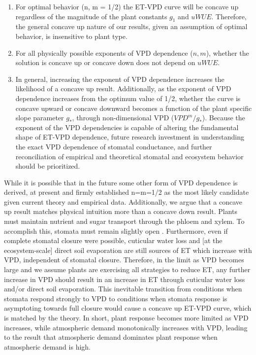 \documentclass[draft,linenumbers]{agujournal}
\begin{document}
\begin{enumerate}
  \item For optimal behavior (n, m = 1/2) the ET-VPD curve will be
    concave up regardless of the magnitude of the plant constants
    $g_1$ and $uWUE$. Therefore, the general concave up nature of our
    results, given an assumption of optimal behavior, is insensitive
    to plant type.
  \item For all physically possible exponents of VPD dependence ($n,
    m$), whether the solution is concave up or concave down does not
    depend on $uWUE$.
  \item In general, increasing the exponent of VPD dependence
    increases the likelihood of a concave up result. Additionally, as
    the exponent of VPD dependence increases from the optimum value of
    1/2, whether the curve is concave upward or concave downward
    becomes a function of the plant specific slope parameter $g_*$,
    through non-dimensional VPD ($VPD^m/g_*$). Because the exponent of
    the VPD dependencies is capable of altering the fundamental shape
    of ET-VPD dependence, future research investment in understanding
    the exact VPD dependence of stomatal conductance, and further
    reconciliation of empirical and theoretical stomatal and
    ecosystem behavior should be prioritized.
\end{enumerate}
While it is possible that in the future some other form of
VPD dependence is derived, at present \cite{MEDLYN_2011} and
\cite{Zhou_2014} firmly established n=m=1/2 as the most likely
candidate given current theory and empirical data. Additionally, we
argue that a concave up result matches physical intuition more than a
concave down result. Plants must maintain nutrient and sugar transport
through the phloem and xylem. To accomplish this, stomata must remain
slightly open \citep{De_2013, Nikinmaa_2013, Ryan_2014}. Furthermore,
even if complete stomatal closure were possible, cuticular water loss
and [at the ecosystem-scale] direct soil evaporation are still sources
of ET which increase with VPD, independent of stomatal
closure. Therefore, in the limit as VPD becomes large and we assume
plants are exercising all strategies to reduce ET, any further increase
in VPD should result in an increase in ET through cuticular water loss
and/or direct soil evaporation. This inevitable transition from
conditions when stomata respond strongly to VPD to conditions when
stomata response is asymptoting towards full closure would cause a
concave up ET-VPD curve, which is matched by the theory. In short,
plant response becomes more limited as VPD increases, while
atmospheric demand monotonically increases with VPD, leading to the
 result that atmospheric demand dominates plant response when
atmospheric demand is high.
\end{document}
